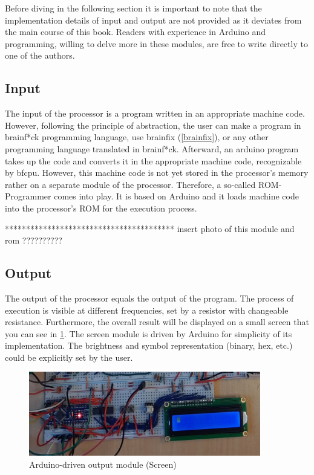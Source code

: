 Before diving in the following section it is important to note that the implementation details of input and output are not provided as it deviates from the main course of this book. Readers with experience in Arduino and programming, willing to delve more in these modules, are free to write directly to one of the authors.

\subsection{Input} \label{sec:implementation:input}
The input of the processor is a program written in an appropriate machine code. However, following the principle of abstraction, the user can make a program in brainf*ck programming language, use brainfix (\ref{brainfix}), or any other programming language translated in brainf*ck. Afterward, an arduino program takes up the code and converts it in the appropriate machine code, recognizable by bfcpu. However, this machine code is not yet stored in the processor's memory rather on a separate module of the processor. Therefore, a so-called ROM-Programmer comes into play. It is based on Arduino and it loads machine code into the processor's ROM for the execution process.

**************************************** insert photo of this module and rom ??????????

\subsection{Output} \label{sec:implementation:output}
The output of the processor equals the output of the program. The process of execution is visible at different frequencies, set by a resistor with changeable resistance. Furthermore, the overall result will be displayed on a small screen that you can see in \ref{fig:output:screen_module}. The screen module is driven by Arduino for simplicity of its implementation. The brightness and symbol representation (binary, hex, etc.) could be explicitly set by the user.

\begin{figure}[H]
	\centering
	\includegraphics[width=0.9\textwidth]{img/screen}
	\caption{Arduino-driven output module (Screen)}
	\label{fig:output:screen_module}
\end{figure}
